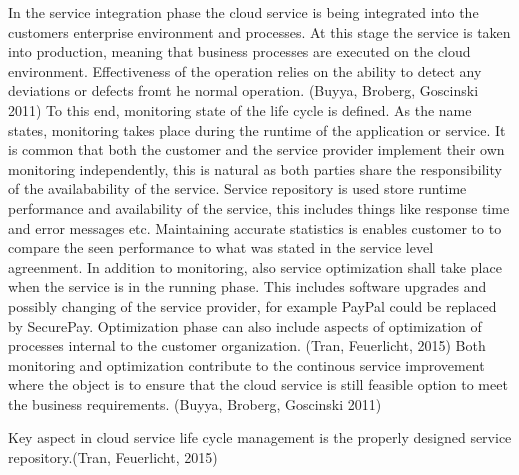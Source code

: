 \documentclass{article}
\begin{document}
In the service integration phase the cloud service is being integrated into the customers enterprise environment and processes. At this stage the service is taken into production, meaning that business processes are executed on the cloud environment. Effectiveness of the operation relies on the ability to detect any deviations or defects fromt he normal operation. (Buyya, Broberg, Goscinski 2011) To this end, monitoring state of the life cycle is defined. As the name states, monitoring takes place during the runtime of the application or service. It is common that both the customer and the service provider implement their own monitoring independently, this is natural as both parties share the responsibility of the availabability of the service. Service repository  is used store runtime performance and availability of the service, this includes things like response time and error messages etc. Maintaining accurate statistics is enables customer to to compare the seen performance to what was stated in the service level agreenment. In addition to monitoring, also service optimization shall take place when the service is in the running phase. This includes software upgrades and possibly changing of the service provider, for example PayPal could be replaced by SecurePay. Optimization phase can also include aspects of optimization of processes internal to the customer organization. (Tran, Feuerlicht, 2015) Both monitoring and optimization contribute to the continous service improvement where the object is to ensure that the cloud service is still feasible option to meet the business requirements. (Buyya, Broberg, Goscinski 2011)
\par
Key aspect in cloud service life cycle management is the properly designed service repository.(Tran, Feuerlicht, 2015)
\end{document}
